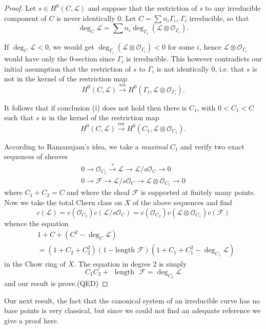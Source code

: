 \begin{proof}
Let $s\in H^{0}(C,\mathscr{L})$ and suppose that the restriction of
$s$ to any irreducible component of $C$ is never identically $0$. Let
$C=\sum n_{i}\Gamma_{i}$, $\Gamma_{i}$ irreducible, so that
$$
\deg_{C}\mathscr{L}=\sum
n_{i}\deg_{\Gamma_{i}}(\mathscr{L}\otimes \mathscr{O}_{\Gamma_{i}}). 
$$

If $\deg_{C}\mathscr{L}<0$, we would get
$\deg_{\Gamma_{i}}(\mathscr{L}\otimes \mathscr{O}_{\Gamma_{i}})<0$ for
some $i$, hence $\mathscr{L}\otimes \mathscr{O}_{\Gamma_{i}}$ would
have only the 0-section since $\Gamma_{i}$ is irreducible. This
however contradicts our initial assumption that the restriction of $s$
to $\Gamma_{i}$ is not identically 0, i.e. that $s$ is not in the
kernel of the restriction map
$$
H^{0}(C,\mathscr{L})\xrightarrow{\text{res}}
H^{0}(\Gamma_{i},\mathscr{L}\otimes \mathscr{O}_{\Gamma_{i}}).
$$

It follows that if conclusion (i) does not hold then there is $C_{1}$,
with $0<C_{1}<C$ such that $s$ is in the kernel of the restriction map 
$$
H^{0}(C,\mathscr{L})\xrightarrow{\text{res}}H^{0}(C_{1},\mathscr{L}\otimes \mathscr{O}_{C_{1}}).
$$\pageoriginale

According to Ramanujam's idea, we take a {\em maximal} $C_{1}$ and
verify two exact sequences of sheaves
\begin{gather*}
0\to \mathscr{O}_{C_{2}}\xrightarrow{s}\mathscr{L}\to \mathscr{L}/s\mathscr{O}_{C}\to
0\\
0\to \mathscr{F}\to \mathscr{L}/s\mathscr{O}_{C}\to \mathscr{L}\otimes \mathscr{O}_{C_{1}}\to 0
\end{gather*}
where $C_{1}+C_{2}=C$ and where the sheaf $\mathscr{F}$ is supported
at finitely many points. Now we take the total Chern class on $X$ of
the above sequences and find
$$
c(\mathscr{L})=c(\mathscr{O}_{C_{2}})c(\mathscr{L}/s\mathscr{O}_{C})=c(\mathscr{O}_{C_{2}})c(\mathscr{L}\otimes \mathscr{O}_{C_{1}})c(\mathscr{F})
$$
whence the equation
\begin{align*}
& 1+C+(C^{2}-\deg_{C}\mathscr{L})\\
&
=(1+C_{2}+C^{2}_{2})(1-\text{length~}\mathscr{F})(1+C_{1}+C^{2}_{1}-\deg_{C_{1}}\mathscr{L}) 
\end{align*}
in the Chow ring of $X$. The equation in degree 2 is simply
$$
C_{1}C_{2}+\text{~ length~ } \mathscr{F}=\deg_{C_{2}}\mathscr{L}
$$
and our result is prove.\hfill (QED)
\end{proof}

Our next result, the fact that the canonical system of an irreducible
curve has no base points is very classical, but since we could not
find an adequate reference we give a proof here.

